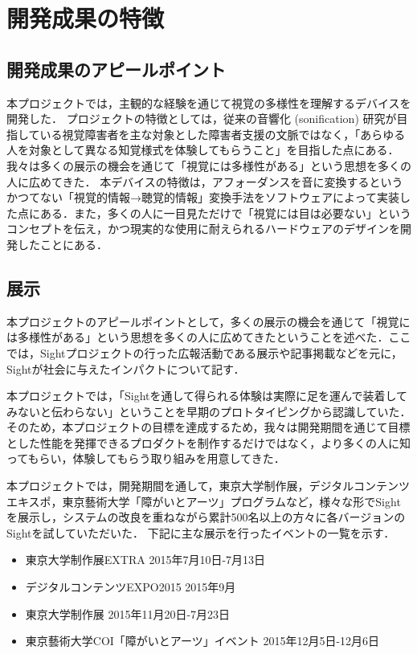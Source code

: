 \section{開発成果の特徴}
\subsection{開発成果のアピールポイント}
本プロジェクトでは，主観的な経験を通じて視覚の多様性を理解するデバイスを開発した．
プロジェクトの特徴としては，従来の音響化 (sonification) 研究が目指している視覚障害者を主な対象とした障害者支援の文脈ではなく，「あらゆる人を対象として異なる知覚様式を体験してもらうこと」を目指した点にある．我々は多くの展示の機会を通じて「視覚には多様性がある」という思想を多くの人に広めてきた．
本デバイスの特徴は，アフォーダンスを音に変換するというかつてない「視覚的情報→聴覚的情報」変換手法をソフトウェアによって実装した点にある．また，多くの人に一目見ただけで「視覚には目は必要ない」というコンセプトを伝え，かつ現実的な使用に耐えられるハードウェアのデザインを開発したことにある．

\subsection{展示}
本プロジェクトのアピールポイントとして，多くの展示の機会を通じて「視覚には多様性がある」という思想を多くの人に広めてきたということを述べた．ここでは，Sightプロジェクトの行った広報活動である展示や記事掲載などを元に，Sightが社会に与えたインパクトについて記す．


本プロジェクトでは，「Sightを通して得られる体験は実際に足を運んで装着してみないと伝わらない」ということを早期のプロトタイピングから認識していた．そのため，本プロジェクトの目標を達成するため，我々は開発期間を通じて目標とした性能を発揮できるプロダクトを制作するだけではなく，より多くの人に知ってもらい，体験してもらう取り組みを用意してきた．

本プロジェクトでは，開発期間を通して，東京大学制作展，デジタルコンテンツエキスポ，東京藝術大学「障がいとアーツ」プログラムなど，様々な形でSightを展示し，システムの改良を重ねながら累計500名以上の方々に各バージョンのSightを試していただいた．
下記に主な展示を行ったイベントの一覧を示す．

\begin{itemize}
 \item 東京大学制作展EXTRA 2015年7月10日-7月13日
 \item デジタルコンテンツEXPO2015 2015年9月
 \item 東京大学制作展 2015年11月20日-7月23日
 \item 東京藝術大学COI「障がいとアーツ」イベント 2015年12月5日-12月6日
\end{itemize}


